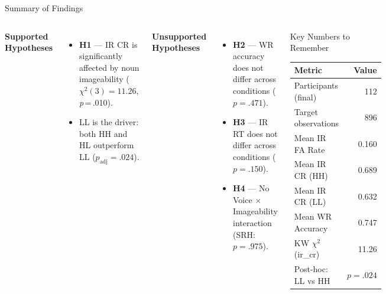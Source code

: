 \documentclass[aspectratio=169, 10pt]{beamer}
\newcommand{\pval}[1]{\textit{p}\,=\,#1}
\newcommand{\kw}[3]{$\chi^{2}(#1)=#2$, \pval{#3}}  %
\begin{document}
\begin{frame}{Summary of Findings}
  \begin{columns}[T]
      \textbf{Supported Hypotheses}
      \begin{itemize}
        \item[\checkmark] \textbf{H1} — IR CR is significantly affected by noun imageability (\kw{3}{11.26}{.010}).
        \item[\checkmark] LL is the driver: both HH and HL outperform LL ($p_\text{adj} = .024$).
      \end{itemize}
      \vspace{0.5em}
      \textbf{Unsupported Hypotheses}
      \begin{itemize}
        \item[$\times$] \textbf{H2} — WR accuracy does not differ across conditions ($p = .471$).
        \item[$\times$] \textbf{H3} — IR RT does not differ across conditions ($p = .150$).
        \item[$\times$] \textbf{H4} — No Voice $\times$ Imageability interaction (SRH: $p = .975$).
      \end{itemize}

      \begin{exampleblock}{Key Numbers to Remember}
        \footnotesize
        \renewcommand{\arraystretch}{1.2}
        \begin{tabular}{lr}
          \toprule
          Metric & Value \\
          \midrule
          Participants (final) & 112  \\
          Target observations  & 896  \\
          Mean IR FA Rate      & 0.160  \\
          Mean IR CR (HH)      & 0.689  \\
          Mean IR CR (LL)      & 0.632  \\
          Mean WR Accuracy     & 0.747 \\
          KW $\chi^2$ (ir\_cr) & 11.26  \\
          Post-hoc: LL vs HH   & $p = .024$  \\
          \bottomrule
        \end{tabular}
      \end{exampleblock}
  \end{columns}
\end{frame}
\end{document}
